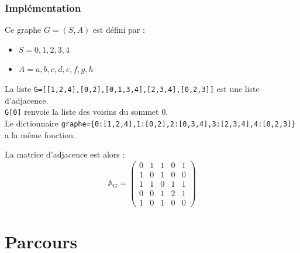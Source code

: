 \begin{frame}[fragile]
\frametitle{Implémentation}
\begin{minipage}[l]{0.25\linewidth}
\end{minipage}
\begin{minipage}[l]{0.7\linewidth}
Ce graphe $G=(S,A)$ est défini par :
\begin{itemize}
\item $S={0,1,2,3,4}$
\item $A={a, b, c, d, e, f, g, h}$
\end{itemize}
\end{minipage}

La liste \verb?G=[[1,2,4],[0,2],[0,1,3,4],[2,3,4],[0,2,3]]? est une liste d'adjacence.\\
\verb?G[0]? renvoie la liste des voisins du sommet 0.\\
Le dictionnaire \verb?graphe={0:[1,2,4],1:[0,2],2:[0,3,4],3:[2,3,4],4:[0,2,3]}? a la même fonction.

La matrice d'adjacence est alors :
$$\mathbb{A}_G=
\begin{pmatrix}
0 & 1 & 1 & 0 & 1 \\
1 & 0 & 1 & 0 & 0 \\
1 & 1 & 0 & 1 & 1 \\
0 & 0 & 1 & 2 & 1 \\
1 & 0 & 1 & 0 & 0  
\end{pmatrix}$$

\end{frame}

\section{Parcours}

